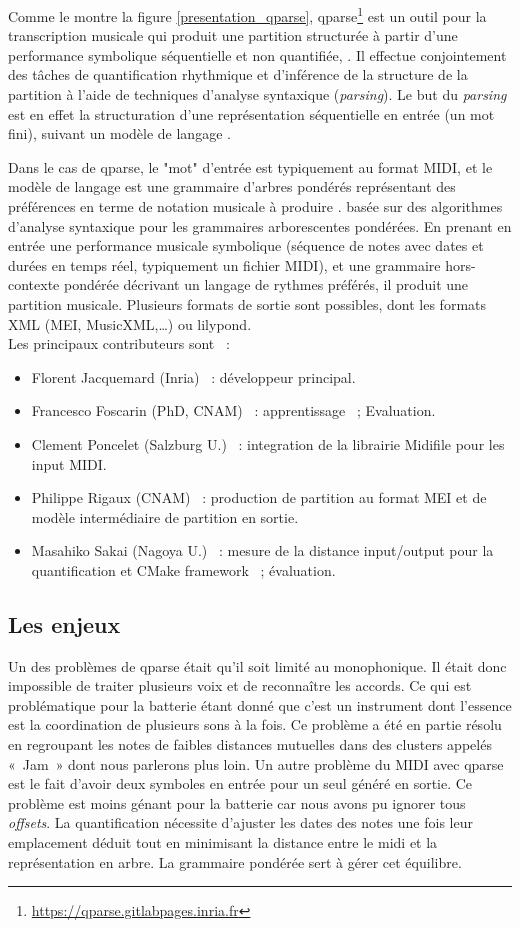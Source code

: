 Comme le montre la figure \ref{presentation_qparse}, qparse\footnote{
\url{https://qparse.gitlabpages.inria.fr}} est un outil pour la transcription
musicale qui produit une partition structurée à partir d’une performance symbolique séquentielle et non
quantifiée, . Il effectue conjointement des
tâches de quantification rhythmique et d’inférence de la structure de la
partition à l’aide de techniques d’analyse syntaxique (\textit{parsing}). Le
but du \textit{parsing} est en effet la structuration d’une représentation
séquentielle en entrée (un mot fini), suivant un modèle de langage
\cite{grune2007parsing}.

Dans le cas de qparse, le "mot" d’entrée est typiquement au format MIDI, et le
modèle de langage est une grammaire d’arbres pondérés représentant des
préférences en terme de notation musicale à produire \cite{droste2009handbook}.
basée sur des algorithmes d’analyse syntaxique pour les grammaires
arborescentes pondérées. En prenant en entrée une performance musicale
symbolique (séquence de notes avec dates et durées en temps réel, typiquement
un fichier MIDI), et une grammaire hors-contexte pondérée décrivant un langage
de rythmes préférés, il produit une partition musicale. Plusieurs formats de
sortie sont possibles, dont les formats XML (MEI, MusicXML,…) ou lilypond.\\

Les principaux contributeurs sont~ :
\begin{itemize}
	\item Florent Jacquemard (Inria)~ : développeur principal.
	\item Francesco Foscarin (PhD, CNAM)~ : apprentissage~ ; Evaluation.
	\item Clement Poncelet (Salzburg U.)~ : integration de la librairie Midifile
        pour les input MIDI.
	\item Philippe Rigaux (CNAM)~ : production de partition au format MEI et de
        modèle intermédiaire de partition en sortie.
	\item Masahiko Sakai (Nagoya U.)~ : mesure de la distance input/output pour
        la quantification et CMake framework~ ; évaluation.
\end{itemize}

\subsection*{Les enjeux}
Un des problèmes de qparse était qu’il soit limité au monophonique. Il était
donc impossible de traiter plusieurs voix et de reconnaître les accords. Ce qui
est problématique pour la batterie étant donné que c’est un instrument dont l’essence
est la coordination de plusieurs sons à la fois. Ce problème a été en partie résolu
en regroupant les notes de faibles distances mutuelles dans des clusters appelés
«~Jam~» dont nous parlerons plus loin.
Un autre problème du MIDI avec qparse est le fait d’avoir deux symboles en entrée
pour un seul généré en sortie. Ce problème est moins génant pour la batterie car
nous avons pu ignorer tous \textit{offsets}.
La quantification nécessite d’ajuster les dates des notes une fois leur emplacement
déduit tout en minimisant la distance entre le midi et la représentation en arbre. La grammaire pondérée sert à gérer cet équilibre.
